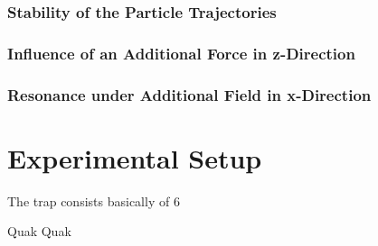 \documentclass[
	paper=A4,
	parskip=full,
	chapterprefix=true,
	11pt,
	headings=normal,
	bibliography=totoc,
	listof=totoc,
	titlepage=on,
]{scrreprt}
\begin{document}
\subsection{Stability of the Particle Trajectories}



\subsection{Influence of an Additional Force in z-Direction}
\subsection{Resonance under Additional Field in x-Direction}




\chapter{Experimental Setup}
The trap consists basically of 6 


Quak Quak
\end{document}
